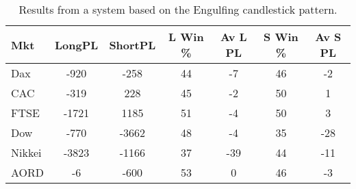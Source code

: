 \begin{table}[ht]
\centering
\caption[Results from a system based on the Engulfing candlestick pattern]{Results from a system based on the Engulfing candlestick pattern.} 
\label{tab:engulf_results}
\begin{tabular}{lcccccc}
  \toprule Mkt & LongPL & ShortPL & L Win \% & Av L PL & S Win \% & Av S PL \\ 
  \midrule Dax & -920 & -258 & 44 & -7 & 46 & -2 \\ 
  CAC & -319 & 228 & 45 & -2 & 50 & 1 \\ 
  FTSE & -1721 & 1185 & 51 & -4 & 50 & 3 \\ 
  Dow & -770 & -3662 & 48 & -4 & 35 & -28 \\ 
  Nikkei & -3823 & -1166 & 37 & -39 & 44 & -11 \\ 
  AORD & -6 & -600 & 53 & 0 & 46 & -3 \\ 
   \bottomrule \end{tabular}
\end{table}
